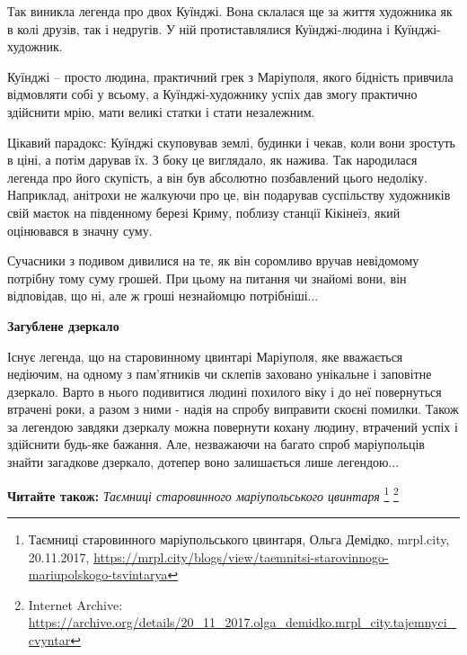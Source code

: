 
Так виникла легенда про двох Куїнджі. Вона склалася ще за життя художника як в
колі друзів, так і недругів. У ній протиставлялися Куїнджі-людина і
Куїнджі-художник.

Куїнджі – просто людина, практичний грек з Маріуполя, якого бідність привчила
відмовляти собі у всьому, а Куїнджі-художнику успіх дав змогу практично
здійснити мрію, мати великі статки і стати незалежним.

Цікавий парадокс: Куїнджі скуповував землі, будинки і чекав, коли вони зростуть
в ціні, а потім дарував їх. З боку це виглядало, як нажива. Так народилася
легенда про його скупість, а він був абсолютно позбавлений цього недоліку.
Наприклад, анітрохи не жалкуючи про це, він подарував суспільству художників
свій маєток на південному березі Криму, поблизу станції Кікінеїз, який
оцінювався в значну суму.

Сучасники з подивом дивилися на те, як він соромливо вручав невідомому потрібну
тому суму грошей. При цьому на питання чи знайомі вони, він відповідав, що ні,
але ж гроші незнайомцю потрібніші...

\begin{center}
\textbf{Загублене дзеркало}
\end{center}

Існує легенда, що на старовинному цвинтарі Маріуполя, яке вважається недіючим,
на одному з пам'ятників чи склепів заховано унікальне і заповітне дзеркало.
Варто в нього подивитися людині похилого віку і до неї повернуться втрачені
роки, а разом з ними - надія на спробу виправити скоєні помилки. Також за
легендою завдяки дзеркалу можна повернути кохану людину, втрачений успіх і
здійснити будь-яке бажання. Але, незважаючи на багато спроб маріупольців знайти
загадкове дзеркало, дотепер воно залишається лише легендою...

\textbf{Читайте також:} \emph{Таємниці старовинного маріупольського цвинтаря}%
\footnote{Таємниці старовинного маріупольського цвинтаря, Ольга Демідко, mrpl.city, 20.11.2017, \url{https://mrpl.city/blogs/view/taemnitsi-starovinnogo-mariupolskogo-tsvintarya}} %
\footnote{Internet Archive: \url{https://archive.org/details/20_11_2017.olga_demidko.mrpl_city.tajemnyci_cvyntar}}
